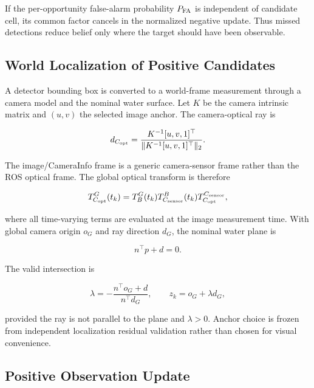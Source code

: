 \documentclass[conference]{IEEEtran}
\begin{document}
If the per-opportunity false-alarm probability $P_{\rm FA}$ is independent of
candidate cell, its common factor cancels in the normalized negative update.
Thus missed detections reduce belief only where the target should have been
observable.

\subsection{World Localization of Positive Candidates}

A detector bounding box is converted to a world-frame measurement through a
camera model and the nominal water surface. Let $K$ be the camera intrinsic
matrix and $(u,v)$ the selected image anchor. The camera-optical ray is

\begin{equation}
d_{C_{\rm opt}}
=\frac{K^{-1}[u,v,1]^\top}
{\|K^{-1}[u,v,1]^\top\|_2}.
\label{eq:camera_ray}
\end{equation}

The image/CameraInfo frame is a generic camera-sensor frame rather than the ROS
optical frame. The global optical transform is therefore

\begin{equation}
T^G_{C_{\rm opt}}(t_k)=
T^G_B(t_k)
T^B_{C_{\rm sensor}}(t_k)
T^{C_{\rm sensor}}_{C_{\rm opt}},
\label{eq:camera_transform_chain}
\end{equation}

where all time-varying terms are evaluated at the image measurement time.
With global camera origin $o_G$ and ray direction $d_G$, the nominal water
plane is

\begin{equation}
n^\top p+d=0.
\label{eq:water_plane}
\end{equation}

The valid intersection is

\begin{equation}
\lambda=-\frac{n^\top o_G+d}{n^\top d_G},\qquad
z_k=o_G+\lambda d_G,
\label{eq:ray_plane}
\end{equation}

provided the ray is not parallel to the plane and $\lambda>0$. Anchor choice is
frozen from independent localization residual validation rather than chosen for
visual convenience.

\subsection{Positive Observation Update}
\end{document}
